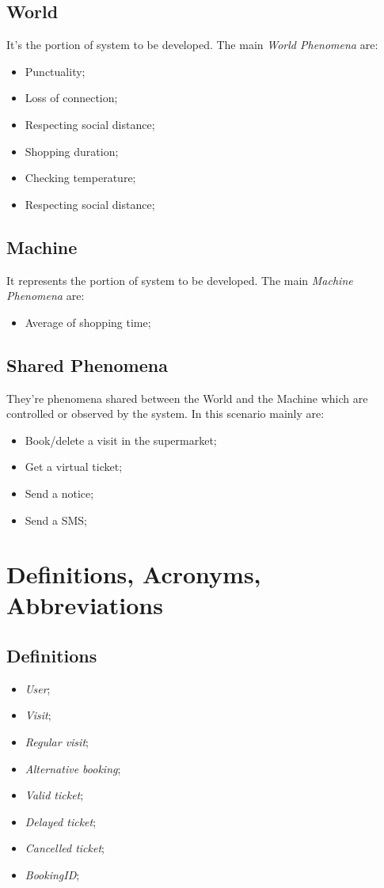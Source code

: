 \subsection{World}
It's the portion of system to be developed. The main \textit{World Phenomena} are:

\begin{itemize}
\item Punctuality;
\item Loss of connection;
\item Respecting social distance;
\item Shopping duration;
\item Checking temperature;
\item Respecting social distance;
\end{itemize}

\subsection{Machine}
It represents the portion of system to be developed. The main \textit{Machine Phenomena} are:
\begin{itemize}
\item Average of shopping time;
\end{itemize}
\subsection{Shared Phenomena} 
They're phenomena shared between the World and the Machine which are controlled or observed by the system. In this scenario mainly are:

\begin{itemize}
\item Book/delete a visit in the supermarket;
\item Get a virtual ticket;
\item Send a notice;
\item Send a SMS;

\end{itemize}


\section{Definitions, Acronyms, Abbreviations}
\subsection{Definitions}

\begin{itemize}
\item \textit{User};
\item \textit{Visit};
\item \textit{Regular visit};
\item \textit{Alternative booking};
\item \textit{Valid ticket};
\item \textit{Delayed ticket};
\item \textit{Cancelled ticket};
\item \textit{BookingID};
\end{itemize}



